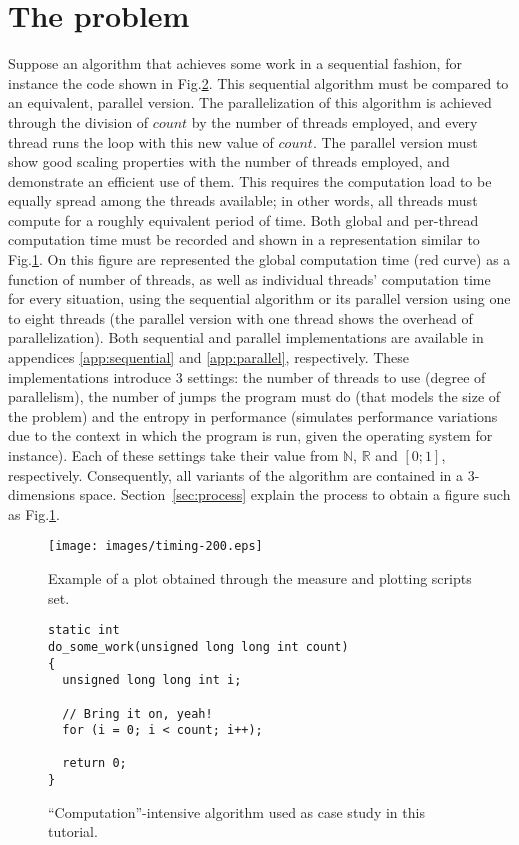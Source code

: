 \section{The problem}
\label{sec:problem}
Suppose an algorithm that achieves some work in a sequential fashion, for instance the code shown in Fig.\ref{fig:do_some_work}. This sequential algorithm must be compared to an equivalent, parallel version. The parallelization of this algorithm is achieved through the division of $count$ by the number of threads employed, and every thread runs the loop with this new value of $count$. The parallel version must show good scaling properties with the number of threads employed, and demonstrate an efficient use of them. This requires the computation load to be equally spread among the threads available; in other words, all threads must compute for a roughly equivalent period of time. Both global and per-thread computation time must be recorded and shown in a representation similar to Fig.\ref{fig:timing-200}. On this figure are represented the global computation time (red curve) as a function of number of threads, as well as individual threads' computation time for every situation, using the sequential algorithm or its parallel version using one to eight threads (the parallel version with one thread shows the overhead of parallelization). Both sequential and parallel implementations are available in appendices \ref{app:sequential} and \ref{app:parallel}, respectively. These implementations introduce 3 settings: the number of threads to use (degree of parallelism), the number of jumps the program must do (that models the size of the problem) and the entropy in performance (simulates performance variations due to the context in which the program is run, given the operating system for instance). Each of these settings take their value from $\mathbb{N}$, $\mathbb{R}$ and $\left[0;1\right]$, respectively. Consequently, all variants of the algorithm are contained in a 3-dimensions space. Section~\ref{sec:process} explain the process to obtain a figure such as Fig.\ref{fig:timing-200}.

\begin{figure}
\centering
\texttt{[image: images/timing-200.eps]}
\caption{Example of a plot obtained through the measure and plotting scripts set.}
\label{fig:timing-200}
\end{figure}

\begin{figure}
\centering
\begin{lstlisting}
static int
do_some_work(unsigned long long int count)
{
  unsigned long long int i;

  // Bring it on, yeah!
  for (i = 0; i < count; i++);

  return 0;
}
\end{lstlisting}
\caption{``Computation''-intensive algorithm used as case study in this tutorial.}
\label{fig:do_some_work}
\end{figure}

